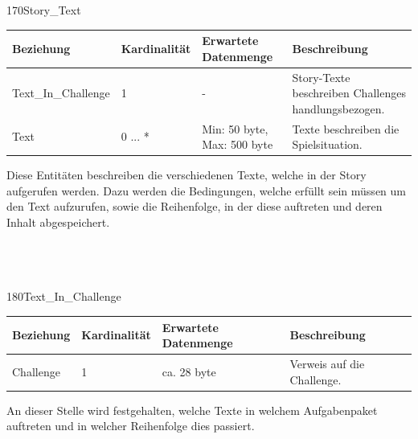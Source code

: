 \newpage
\begin{entity}{170}{Story\_Text}
\begin{center}
	\begin{longtable}{|m{4cm}|m{}|m{}|m{}|}
 	 \hline
 	 \textbf{Beziehung} & \textbf{Kardinalität} &  \textbf{Erwartete Datenmenge} & \textbf{Beschreibung} \\
  	\hline
  	Text\_In\_Challenge & 1 & - & Story-Texte beschreiben Challenges handlungsbezogen.\\
  	\hline
  	Text & 0 ... * & Min: 50 byte, Max: 500 byte & Texte beschreiben die Spielsituation.\\
	  \hline
	\end{longtable}
\end{center}
Diese Entitäten beschreiben die verschiedenen Texte, welche in der Story aufgerufen werden. Dazu werden die Bedingungen, welche erfüllt sein müssen um den Text aufzurufen, sowie die Reihenfolge, in der diese auftreten und deren Inhalt abgespeichert. \\\\\\\
\end{entity}

\begin{entity}{180}{Text\_In\_Challenge}
\begin{center}
	\begin{longtable}{|m{4cm}|m{}|m{}|m{}|}
 	 \hline
 	 \textbf{Beziehung} & \textbf{Kardinalität} &  \textbf{Erwartete Datenmenge} & \textbf{Beschreibung} \\
  	\hline
  	Challenge & 1 & ca. 28 byte & Verweis auf die Challenge.\\
	  \hline
	\end{longtable}
\end{center}
An dieser Stelle wird festgehalten, welche Texte in welchem Aufgabenpaket auftreten und in welcher Reihenfolge dies passiert.
\end{entity}

